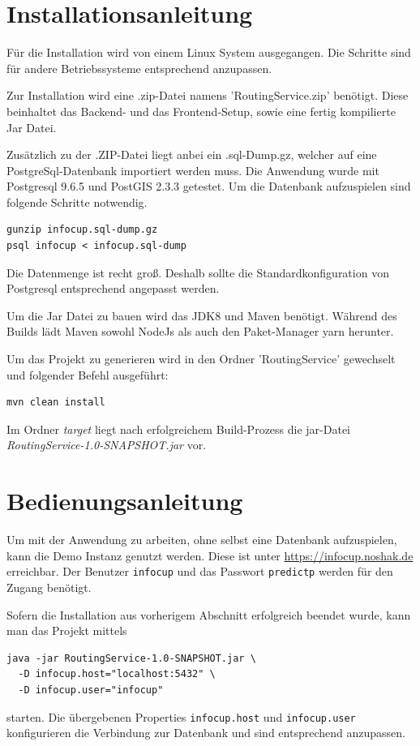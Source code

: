 \documentclass[
ngerman          %
,a4paper          %
,11pt
,pdftex
]{report}
\begin{document}
\section*{Installationsanleitung}
\label{label:installation}
Für die Installation wird von einem Linux System ausgegangen. Die Schritte sind für andere Betriebssysteme entsprechend anzupassen.

Zur Installation wird eine .zip-Datei namens 'RoutingService.zip' benötigt. Diese beinhaltet das Backend- und das Frontend-Setup, sowie eine fertig kompilierte Jar Datei.

Zusätzlich zu der .ZIP-Datei liegt anbei ein .sql-Dump.gz, welcher auf eine PostgreSql-Datenbank importiert werden muss. Die Anwendung wurde mit Postgresql 9.6.5 und PostGIS 2.3.3 getestet. Um die Datenbank aufzuspielen sind folgende Schritte notwendig.

\begin{lstlisting}
gunzip infocup.sql-dump.gz
psql infocup < infocup.sql-dump
\end{lstlisting}

Die Datenmenge ist recht groß. Deshalb sollte die Standardkonfiguration von Postgresql entsprechend angepasst werden.

Um die Jar Datei zu bauen wird das JDK8 und Maven benötigt. Während des Builds lädt Maven sowohl NodeJs als auch den Paket-Manager yarn herunter.

Um das Projekt zu generieren wird in den Ordner 'RoutingService' gewechselt und folgender Befehl ausgeführt:
\begin{lstlisting}
mvn clean install
\end{lstlisting}
Im Ordner {\em target} liegt nach erfolgreichem Build-Prozess die jar-Datei {\em RoutingService-1.0-SNAPSHOT.jar} vor.

\section*{Bedienungsanleitung}

Um mit der Anwendung zu arbeiten, ohne selbst eine Datenbank aufzuspielen, kann die Demo Instanz genutzt werden. Diese ist unter \url{https://infocup.noshak.de} erreichbar. Der Benutzer \texttt{infocup} und das Passwort \texttt{predictp} werden für den Zugang benötigt.

Sofern die Installation aus vorherigem Abschnitt erfolgreich beendet wurde, kann man das Projekt mittels
\begin{lstlisting}
java -jar RoutingService-1.0-SNAPSHOT.jar \
  -D infocup.host="localhost:5432" \
  -D infocup.user="infocup"
\end{lstlisting}
starten.
Die übergebenen Properties \texttt{infocup.host} und \texttt{infocup.user} konfigurieren die Verbindung zur Datenbank und sind entsprechend anzupassen.
\end{document}
